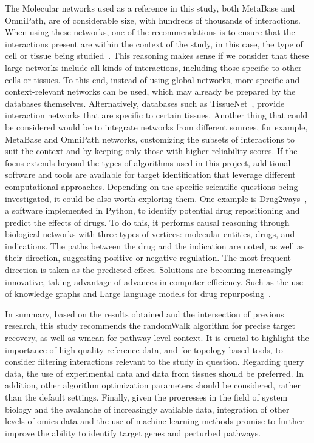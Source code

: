 The \gls{Molecular network}s used as a reference in this study, both MetaBase and OmniPath, are of considerable size, with hundreds of thousands of interactions. 
When using these networks, one of the recommendations is to ensure that the interactions present are within the context of the study, in this case, the type of cell or tissue being studied~\cite{RN38}. 
This reasoning makes sense if we consider that these large networks include all kinds of interactions, including those specific to other cells or tissues. 
To this end, instead of using global networks, more specific and context-relevant networks can be used, which may already be prepared by the databases themselves. 
Alternatively, databases such as TissueNet~\cite{RN137}, provide interaction networks that are specific to certain tissues. 
Another thing that could be considered would be to integrate networks from different sources, for example, MetaBase and OmniPath networks, customizing the subsets of interactions to suit the context and by keeping only those with higher reliability scores. 
If the focus extends beyond the types of algorithms used in this project, additional software and tools are available for target identification that leverage different computational approaches. 
Depending on the specific scientific questions being investigated, it could be also worth exploring them. One example is Drug2ways~\cite{RN132}, a software implemented in Python, to identify potential drug repositioning and predict the effects of drugs. 
To do this, it performs causal reasoning through biological networks with three types of vertices: molecular entities, drugs, and indications. 
The paths between the drug and the indication are noted, as well as their direction, suggesting positive or negative regulation. The most frequent direction is taken as the predicted effect. 
Solutions are becoming increasingly innovative, taking advantage of advances in computer efficiency. 
Such as the use of knowledge graphs and Large language models for drug repurposing~\cite{RN163}. 

In summary, based on the results obtained and the intersection of previous research, this study recommends the randomWalk algorithm for precise target recovery, as well as wmean for pathway-level context. 
It is crucial to highlight the importance of high-quality reference data, and for topology-based tools, to consider filtering interactions relevant to the study in question. 
Regarding query data, the use of experimental data and data from tissues should be preferred. 
In addition, other algorithm optimization parameters should be considered, rather than the default settings. 
Finally, given the progresses in the field of system biology and the avalanche of increasingly available data, integration of other levels of omics data and the use of machine learning methods promise to further improve the ability to identify target genes and perturbed pathways.

